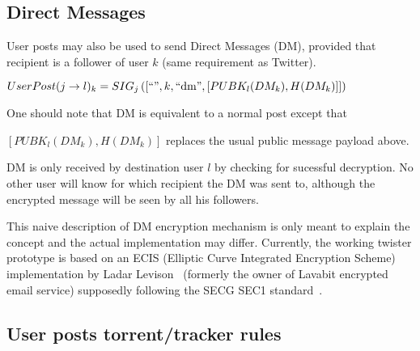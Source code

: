 \documentclass[a4paper,10pt]{article}
\begin{document}
\subsection{Direct Messages}

User posts may also be used to send Direct Messages (DM), provided that recipient is a follower of user $k$ (same requirement as Twitter).

$UserPost(j \rightarrow l)_k = SIG_j\left( \left[\textnormal{``''}, k, \textnormal{``dm''}, [ PUBK_l(DM_k), H(DM_k) ] \right] \right)$

One should note that DM is equivalent to a normal post except that 

$[PUBK_l(DM_k), H(DM_k)]$ replaces the usual public message payload above.

DM is only received by destination user $l$ by checking for sucessful decryption. No other user will know for which recipient the DM was sent to, although the encrypted message will be seen by all his followers.

This naive description of DM encryption mechanism is only meant to explain the concept and the actual implementation may differ. Currently, the working twister prototype is based on an ECIS (Elliptic Curve Integrated Encryption Scheme) implementation by Ladar Levison~\cite{levison2010} (formerly the owner of Lavabit encrypted email service) supposedly following the SECG SEC1 standard~\cite{secg2009sec1}.

\subsection{User posts torrent/tracker rules}
\label{sec:swarm}
\end{document}

